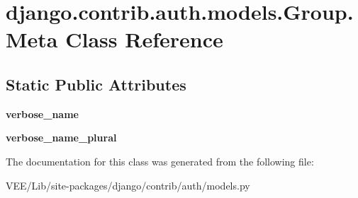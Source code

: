 \hypertarget{classdjango_1_1contrib_1_1auth_1_1models_1_1_group_1_1_meta}{}\section{django.\+contrib.\+auth.\+models.\+Group.\+Meta Class Reference}
\label{classdjango_1_1contrib_1_1auth_1_1models_1_1_group_1_1_meta}
\subsection*{Static Public Attributes}
\begin{DoxyCompactItemize}
\item 
\mbox{\label{classdjango_1_1contrib_1_1auth_1_1models_1_1_group_1_1_meta_a4283f579a7eabc12fcd69eb788490f82}} 
{\bfseries verbose\+\_\+name}
\item 
\mbox{\label{classdjango_1_1contrib_1_1auth_1_1models_1_1_group_1_1_meta_ac29a2346bd0b5daf0821e5a9e567d659}} 
{\bfseries verbose\+\_\+name\+\_\+plural}
\end{DoxyCompactItemize}


The documentation for this class was generated from the following file\+:\begin{DoxyCompactItemize}
\item 
V\+E\+E/\+Lib/site-\/packages/django/contrib/auth/models.\+py\end{DoxyCompactItemize}
